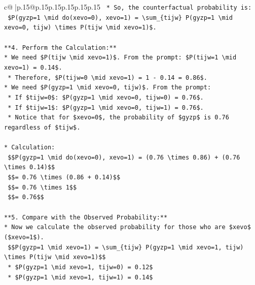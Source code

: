 \documentclass{article}
\begin{document}
{\begin{supertabular}{c@{$\;$}|p{.15\linewidth}@{}p{.15\linewidth}p{.15\linewidth}p{.15\linewidth}p{.15\linewidth}p{.15\linewidth}}
{{{\texttt{    *   So, the counterfactual probability is:} \\
\texttt{        \$P(gyzp=1 \textbackslash{}mid do(xevo=0), xevo=1) = \textbackslash{}sum\_\{tijw\} P(gyzp=1 \textbackslash{}mid xevo=0, tijw) \textbackslash{}times P(tijw \textbackslash{}mid xevo=1)\$.} \\
\\ 
\texttt{**4. Perform the Calculation:**} \\
\texttt{*   We need \$P(tijw \textbackslash{}mid xevo=1)\$. From the prompt: \$P(tijw=1 \textbackslash{}mid xevo=1) = 0.14\$.} \\
\texttt{    *   Therefore, \$P(tijw=0 \textbackslash{}mid xevo=1) = 1 {-} 0.14 = 0.86\$.} \\
\texttt{*   We need \$P(gyzp=1 \textbackslash{}mid xevo=0, tijw)\$. From the prompt:} \\
\texttt{    *   If \$tijw=0\$: \$P(gyzp=1 \textbackslash{}mid xevo=0, tijw=0) = 0.76\$.} \\
\texttt{    *   If \$tijw=1\$: \$P(gyzp=1 \textbackslash{}mid xevo=0, tijw=1) = 0.76\$.} \\
\texttt{    *   Notice that for \$xevo=0\$, the probability of \$gyzp\$ is 0.76 regardless of \$tijw\$.} \\
\\ 
\texttt{*   Calculation:} \\
\texttt{    \$\$P(gyzp=1 \textbackslash{}mid do(xevo=0), xevo=1) = (0.76 \textbackslash{}times 0.86) + (0.76 \textbackslash{}times 0.14)\$\$} \\
\texttt{    \$\$= 0.76 \textbackslash{}times (0.86 + 0.14)\$\$} \\
\texttt{    \$\$= 0.76 \textbackslash{}times 1\$\$} \\
\texttt{    \$\$= 0.76\$\$} \\
\\ 
\texttt{**5. Compare with the Observed Probability:**} \\
\texttt{*   Now we calculate the observed probability for those who are \$xevo\$ (\$xevo=1\$).} \\
\texttt{    \$\$P(gyzp=1 \textbackslash{}mid xevo=1) = \textbackslash{}sum\_\{tijw\} P(gyzp=1 \textbackslash{}mid xevo=1, tijw) \textbackslash{}times P(tijw \textbackslash{}mid xevo=1)\$\$} \\
\texttt{    *   \$P(gyzp=1 \textbackslash{}mid xevo=1, tijw=0) = 0.12\$} \\
\texttt{    *   \$P(gyzp=1 \textbackslash{}mid xevo=1, tijw=1) = 0.14\$} \\
}}}
\end{supertabular}}
\end{document}
